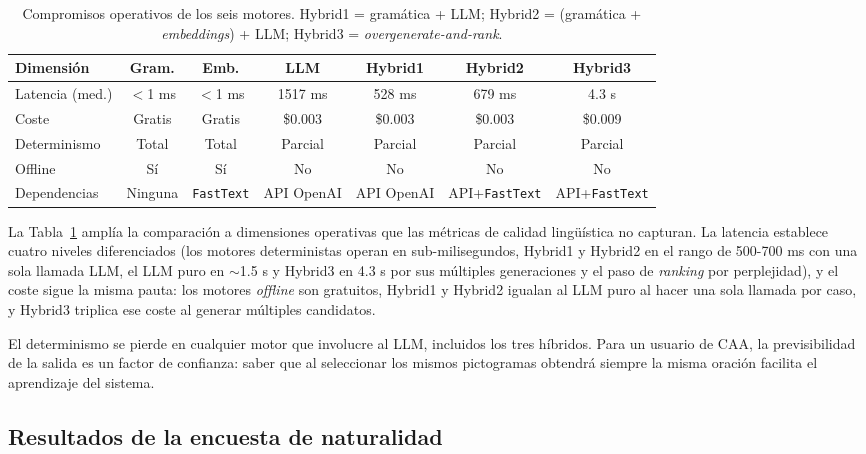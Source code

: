 \begin{table}[ht]
\centering
\footnotesize
\begin{tabular}{l c c c c c c}
\hline
Dimensión & Gram. & Emb. & LLM & Hybrid1 & Hybrid2 & Hybrid3 \\
\hline
Latencia (med.) & $<$1 ms & $<$1 ms & 1517 ms & 528 ms & 679 ms & 4.3 s \\
Coste & Gratis & Gratis & \$0.003 & \$0.003 & \$0.003 & \$0.009 \\
Determinismo & Total & Total & Parcial & Parcial & Parcial & Parcial \\
Offline & Sí & Sí & No & No & No & No \\
Dependencias & Ninguna & \texttt{FastText} & API OpenAI & API OpenAI & API+\texttt{FastText} & API+\texttt{FastText} \\
\hline
\end{tabular}
\caption{Compromisos operativos de los seis motores. Hybrid1 = gramática + LLM; Hybrid2 = (gramática + \textit{embeddings}) + LLM; Hybrid3 = \textit{overgenerate-and-rank}.}
\label{tab:eval-compromisos}
\end{table}

La Tabla~\ref{tab:eval-compromisos} amplía la comparación a dimensiones operativas que las métricas de calidad lingüística no capturan. La latencia establece cuatro niveles diferenciados (los motores deterministas operan en sub-milisegundos, Hybrid1 y Hybrid2 en el rango de 500-700 ms con una sola llamada LLM, el LLM puro en $\sim$1.5 s y Hybrid3 en 4.3 s por sus múltiples generaciones y el paso de \textit{ranking} por perplejidad), y el coste sigue la misma pauta: los motores \textit{offline} son gratuitos, Hybrid1 y Hybrid2 igualan al LLM puro al hacer una sola llamada por caso, y Hybrid3 triplica ese coste al generar múltiples candidatos.

El determinismo se pierde en cualquier motor que involucre al LLM, incluidos los tres híbridos. Para un usuario de CAA, la previsibilidad de la salida es un factor de confianza: saber que al seleccionar los mismos pictogramas obtendrá siempre la misma oración facilita el aprendizaje del sistema.

\subsection{Resultados de la encuesta de naturalidad}
\label{sec:eval-naturalidad}

